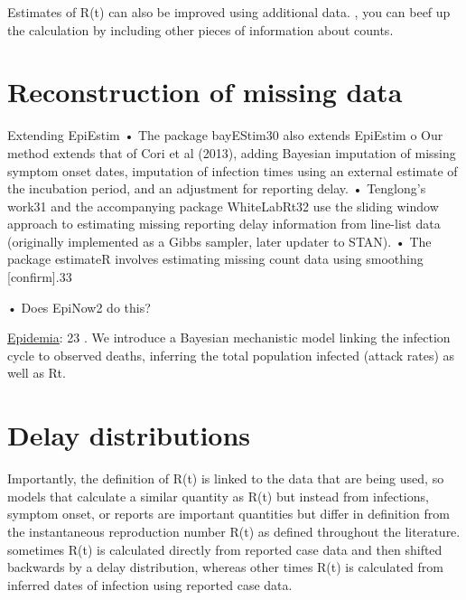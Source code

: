 \documentclass[
  letterpaper,
  DIV=11,
  numbers=noendperiod]{scrreprt}
\begin{document}

Estimates of R(t) can also be improved using additional data. , you can
beef up the calculation by including other pieces of information about
counts.

\section*{Reconstruction of missing
data}\label{reconstruction-of-missing-data}


Extending EpiEstim • The package bayEStim30 also extends EpiEstim o Our
method extends that of Cori et al (2013), adding Bayesian imputation of
missing symptom onset dates, imputation of infection times using an
external estimate of the incubation period, and an adjustment for
reporting delay. • Tenglong's work31 and the accompanying package
WhiteLabRt32 use the sliding window approach to estimating missing
reporting delay information from line-list data (originally implemented
as a Gibbs sampler, later updater to STAN). • The package estimateR
involves estimating missing count data using smoothing {[}confirm{]}.33

• Does EpiNow2 do this?

\href{package_Epidemia.qmd}{Epidemia}: 23 . We introduce a Bayesian
mechanistic model linking the infection cycle to observed deaths,
inferring the total population infected (attack rates) as well as Rt.

\section*{Delay distributions}\label{delay-distributions}


Importantly, the definition of R(t) is linked to the data that are being
used, so models that calculate a similar quantity as R(t) but instead
from infections, symptom onset, or reports are important quantities but
differ in definition from the instantaneous reproduction number R(t) as
defined throughout the literature. sometimes R(t) is calculated directly
from reported case data and then shifted backwards by a delay
distribution, whereas other times R(t) is calculated from inferred dates
of infection using reported case data.
\end{document}
